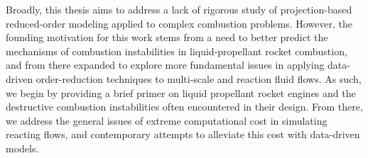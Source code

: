 
Broadly, this thesis aims to address a lack of rigorous study of projection-based reduced-order modeling applied to complex combustion problems. However, the founding motivation for this work stems from a need to better predict the mechanisms of combustion instabilities in liquid-propellant rocket combustion, and from there expanded to explore more fundamental issues in applying data-driven order-reduction techniques to multi-scale and reaction fluid flows. As such, we begin by providing a brief primer on liquid propellant rocket engines and the destructive combustion instabilities often encountered in their design. From there, we address the general issues of extreme computational cost in simulating reacting flows, and contemporary attempts to alleviate this cost with data-driven models.
